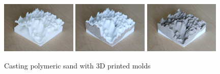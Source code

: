 \documentclass[prodmode,acmtochi]{acmsmall} %
\begin{document}
\begin{figure}[h!]
\begin{center}
		\includegraphics[width=0.32\textwidth]{images/3d_print/3d_print_1.jpg}
		\includegraphics[width=0.32\textwidth]{images/3d_print/3d_print_2.jpg}
		\includegraphics[width=0.32\textwidth]{images/3d_print/3d_print_3.jpg}
	\caption{Casting polymeric sand with 3D printed molds}
	\label{fig:casting}
\end{center}
\end{figure}
\end{document}

